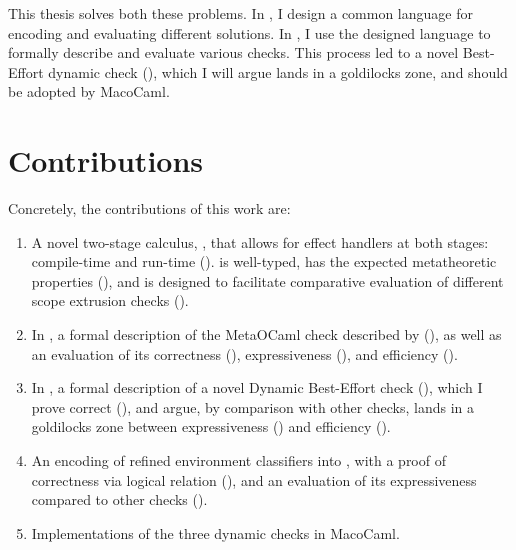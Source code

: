This thesis solves both these problems. In , I design a common language for encoding and evaluating different solutions. In , I use the designed language to formally describe and evaluate various checks. This process led to a novel Best-Effort dynamic check (), which I will argue lands in a goldilocks zone, and should be adopted by MacoCaml.

\section{Contributions}

Concretely, the contributions of this work are:
\begin{enumerate}
    \item A novel two-stage calculus, \calculusName{}, that allows for effect handlers at both stages: compile-time and run-time (). \calculusName{} is well-typed, has the expected metatheoretic properties (), and is designed to facilitate comparative evaluation of different scope extrusion checks ().
    \item In \calculusName{}, a formal description of the MetaOCaml check described by \citet{kiselyov-14} (), as well as an evaluation of its correctness (), expressiveness (), and efficiency ().
    \item In \calculusName{}, a formal description of a novel Dynamic Best-Effort check (), which I prove correct (), and argue, by comparison with other checks, lands in a goldilocks zone between expressiveness () and efficiency (). 
    \item An encoding of refined environment classifiers \citep{kiselyov-16} into \calculusName{}, with a proof of correctness via logical relation (), and an evaluation of its expressiveness compared to other checks ().
    \item Implementations of the three dynamic checks in MacoCaml.
\end{enumerate}

